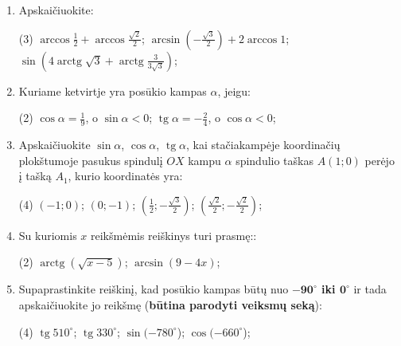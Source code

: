 \documentclass[a4paper]{article}
\DeclareMathOperator{\tg}{tg}
\DeclareMathOperator{\arctg}{arctg}
\begin{document}
\begin{enumerate}
      \item Apskaičiuokite:

            \begin{tasks}[item-format={\normalfont}, after-item-skip=4mm](3)
                  \task $\arccos{\frac{1}{2}} + \arccos{\frac{\sqrt{2}}{2}} $;
                  \task $\arcsin{(-\frac{\sqrt{3}}{2})} + 2\arccos{1} $;
                  \task $\sin({4\arctg{\sqrt{3}} +
                              \arctg{\frac{3}{3\sqrt{3}}}})  $;

            \end{tasks}

      \item Kuriame ketvirtje yra posūkio kampas $\alpha$, jeigu:
            \begin{tasks}[item-format={\normalfont}, after-item-skip=4mm](2)
                  \task $\cos \alpha = \frac{1}{9}$, o $\sin \alpha < 0$;
                  \task $\tg \alpha = -\frac{2}{4}$, o $\cos \alpha < 0$;
            \end{tasks}
      \item Apskaičiuokite $\sin \alpha$, $\cos \alpha$, $\tg \alpha$, kai
            stačiakampėje koordinačių plokštumoje pasukus spindulį $OX$ kampu
            $\alpha$ spindulio taškas $A(1; 0)$ perėjo į tašką $A_{1}$, kurio
            koordinatės
            yra:
            \begin{tasks}[item-format={\normalfont}, after-item-skip=4mm](4)
                  \task $(-1; 0)$;
                  \task $(0; -1)$;
                  \task $(\frac{1}{2}; -\frac{\sqrt{3}}{2})$;
                  \task $(\frac{\sqrt{2}}{2}; -\frac{\sqrt{2}}{2})$;
            \end{tasks}

      \item Su kuriomis $x$ reikšmėmis reiškinys turi prasmę::
            \begin{tasks}[item-format={\normalfont},
                        after-item-skip=4mm](2)
                  \task $\arctg(\sqrt{x-5})$;
                  \task $\arcsin(9-4x)$;
            \end{tasks}

      \item Supaprastinkite reiškinį, kad posūkio kampas būtų nuo
            \textbf{$\boldsymbol{-90^\circ}$
                  iki  $\boldsymbol{0^\circ}$} ir tada apskaičiuokite jo
            reikšmę
            (\textbf{būtina parodyti veiksmų seką}):
            \begin{tasks}[item-format={\normalfont},
                        after-item-skip=4mm](4)
                  \task $\tg 510^\circ$;
                  \task $\tg 330^\circ$;
                  \task $\sin (-780^\circ$);
                        \task $\cos (-660^\circ$);
            \end{tasks}


\end{enumerate}
\end{document}
